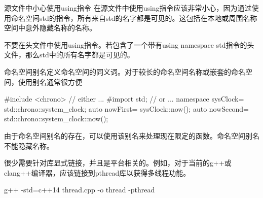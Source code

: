 \begin{myWarning}{源文件中小心使用using指令}
在源文件中使用using指令应该非常小心，因为通过使用命名空间std的指令，所有来自std的名字都是可见的。这包括在本地或周围名称空间中意外隐藏名称的名称。

不要在头文件中使用using指令。若包含了一个带有using namespace std指令的头文件，那么std中的所有名字都是可见的。
\end{myWarning}


命名空间别名定义命名空间的同义词。对于较长的命名空间名称或嵌套的命名空间，使用别名通常很方便

\begin{cpp}
#include <chrono> // either
...
#import std; // or
...
namespace sysClock= std::chrono::system_clock;
auto nowFirst= sysClock::now();
auto nowSecond= std::chrono::system_clock::now();
\end{cpp}

由于命名空间别名的存在，可以使用该别名来处理现在限定的函数。命名空间别名不能隐藏名称。



很少需要针对库显式链接，并且是平台相关的。例如，对于当前的g++或clang++编译器，应该链接到pthread库以获得多线程功能。

\begin{shell}
g++ -std=c++14 thread.cpp -o thread -pthread
\end{shell}